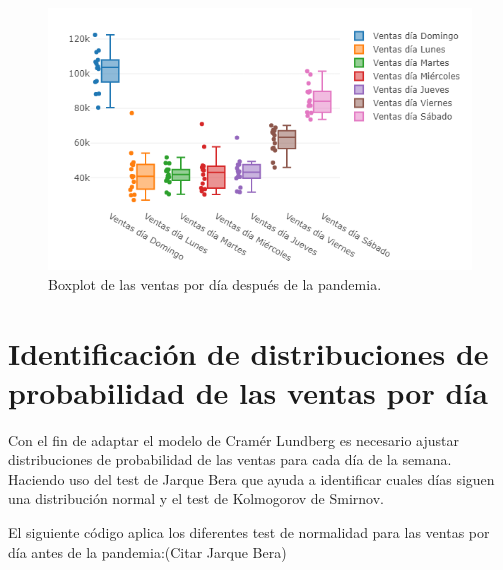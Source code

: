 \documentclass[
  us-letterpaper,
]{scrreprt}
\newenvironment{Shaded}{\begin{snugshade}}{\end{snugshade}}
\newcommand{\CommentTok}[1]{\textcolor[rgb]{0.37,0.37,0.37}{#1}}
\newcommand{\FunctionTok}[1]{\textcolor[rgb]{0.28,0.35,0.67}{#1}}
\newcommand{\NormalTok}[1]{\textcolor[rgb]{0.00,0.23,0.31}{#1}}
\newcommand{\SpecialCharTok}[1]{\textcolor[rgb]{0.37,0.37,0.37}{#1}}
\theoremstyle{definition}
\theoremstyle{plain}
\theoremstyle{plain}
\theoremstyle{remark}
\begin{document}
\begin{figure}[H]

{\centering \includegraphics{fig-box2pdf.png}

}

\caption{Boxplot de las ventas por día después de la pandemia.}

\end{figure}%

\section{Identificación de distribuciones de probabilidad de las ventas
por
día}\label{identificaciuxf3n-de-distribuciones-de-probabilidad-de-las-ventas-por-duxeda}

Con el fin de adaptar el modelo de Cramér Lundberg es necesario ajustar
distribuciones de probabilidad de las ventas para cada día de la semana.
Haciendo uso del test de Jarque Bera que ayuda a identificar cuales días
siguen una distribución normal y el test de Kolmogorov de Smirnov.

El siguiente código aplica los diferentes test de normalidad para las
ventas por día antes de la pandemia:(Citar Jarque Bera)

\begin{Shaded}
\end{Shaded}
\end{document}
